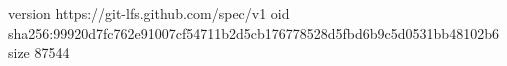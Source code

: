 version https://git-lfs.github.com/spec/v1
oid sha256:99920d7fc762e91007cf54711b2d5cb176778528d5fbd6b9c5d0531bb48102b6
size 87544
